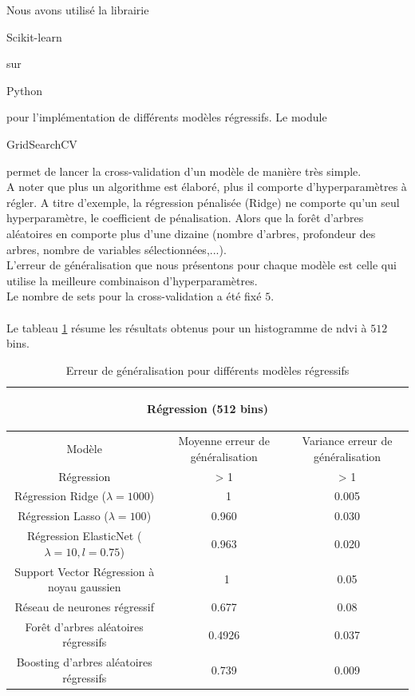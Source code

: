 \documentclass{book}
\begin{document}
Nous avons utilisé la librairie \begin{itshape}Scikit-learn\end{itshape}\cite{scikit-learn} sur \begin{itshape}Python\end{itshape} 
pour l'implémentation de différents modèles régressifs. Le module \begin{itshape}GridSearchCV\end{itshape} permet de lancer
la cross-validation d'un modèle de manière très simple.\\
A noter que plus un algorithme est élaboré, plus il comporte d'hyperparamètres à régler. A titre d'exemple, la régression pénalisée (Ridge)
ne comporte qu'un seul hyperparamètre, le coefficient de pénalisation. Alors que la for\^{e}t d'arbres aléatoires en comporte plus d'une dizaine
(nombre d'arbres, profondeur des arbres, nombre de variables sélectionnées,...).\\
L'erreur de généralisation que nous présentons pour chaque modèle 
est celle qui utilise la meilleure combinaison d'hyperparamètres.\\
Le nombre de sets pour la cross-validation a été fixé $5$.\\
\\
Le tableau \ref{regression_resultats_512} résume les résultats obtenus pour un histogramme de ndvi à $512$ bins.
\begin{table}[H]
\begin{center}
\begin{adjustbox}{max width=\textwidth}
\begin{tabular}{|c|c|c|}
\hline
\multicolumn{3}{|c|}{\begin{bf}Régression (512 bins)\end{bf}} \\
\hline 
Modèle & Moyenne erreur de généralisation & Variance erreur de généralisation\\
\hline 
Régression & > 1 & > 1\\
\hline 
Régression Ridge ($\lambda=1000$) & ~ 1 & 0.005\\
\hline 
Régression Lasso ($\lambda=100$) & 0.960 & 0.030\\
\hline 
Régression ElasticNet ($\lambda=10,l=0.75$) & 0.963 & 0.020\\
\hline
Support Vector Régression à noyau gaussien & ~1 & 0.05\\
\hline
Réseau de neurones régressif & 0.677 & 0.08\\
\hline
For\^{e}t d'arbres aléatoires régressifs & 0.4926 & 0.037\\
\hline
Boosting d'arbres aléatoires régressifs & 0.739 & 0.009\\
\hline
\end{tabular}
\end{adjustbox}
\end{center}
\caption{Erreur de généralisation pour différents modèles régressifs}
\label{regression_resultats_512}
\end{table}
\end{document}
